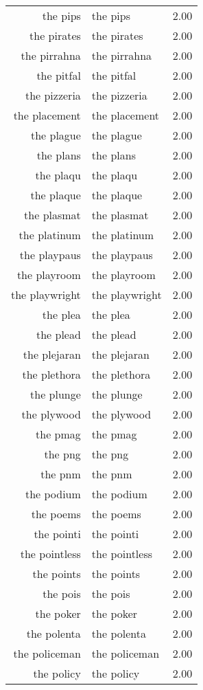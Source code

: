\begin{table}[ht]
\begin{tabular}{rlr}
  the pips & the pips & 2.00 \\ 
  the pirates & the pirates & 2.00 \\ 
  the pirrahna & the pirrahna & 2.00 \\ 
  the pitfal & the pitfal & 2.00 \\ 
  the pizzeria & the pizzeria & 2.00 \\ 
  the placement & the placement & 2.00 \\ 
  the plague & the plague & 2.00 \\ 
  the plans & the plans & 2.00 \\ 
  the plaqu & the plaqu & 2.00 \\ 
  the plaque & the plaque & 2.00 \\ 
  the plasmat & the plasmat & 2.00 \\ 
  the platinum & the platinum & 2.00 \\ 
  the playpaus & the playpaus & 2.00 \\ 
  the playroom & the playroom & 2.00 \\ 
  the playwright & the playwright & 2.00 \\ 
  the plea & the plea & 2.00 \\ 
  the plead & the plead & 2.00 \\ 
  the plejaran & the plejaran & 2.00 \\ 
  the plethora & the plethora & 2.00 \\ 
  the plunge & the plunge & 2.00 \\ 
  the plywood & the plywood & 2.00 \\ 
  the pmag & the pmag & 2.00 \\ 
  the png & the png & 2.00 \\ 
  the pnm & the pnm & 2.00 \\ 
  the podium & the podium & 2.00 \\ 
  the poems & the poems & 2.00 \\ 
  the pointi & the pointi & 2.00 \\ 
  the pointless & the pointless & 2.00 \\ 
  the points & the points & 2.00 \\ 
  the pois & the pois & 2.00 \\ 
  the poker & the poker & 2.00 \\ 
  the polenta & the polenta & 2.00 \\ 
  the policeman & the policeman & 2.00 \\ 
  the policy & the policy & 2.00 \\ 

\end{tabular}
\end{table}
